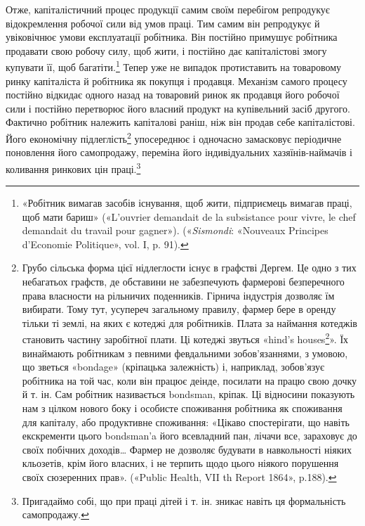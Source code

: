 Отже, капіталістичний процес продукції самим своїм перебігом
репродукує відокремлення робочої сили від умов праці.
Тим самим він репродукує й увіковічнює умови експлуатації
робітника. Він постійно примушує робітника продавати свою
робочу силу, щоб жити, і постійно дає капіталістові змогу купувати
її, щоб багатіти.\footnote{
«Робітник вимагав засобів існування, щоб жити, підприємець
вимагав праці, щоб мати бариш» («L’ouvrier demandait de la subsistance
pour vivre, le chef demandait du travail pour gagner»). («\emph{Sismondi}: «Nouveaux
Principes d’Economie Politique», vol. I, p. 91).
} Тепер уже не випадок протиставить на
товаровому ринку капіталіста й робітника як покупця і продавця.
Механізм самого процесу постійно відкидає одного назад на
товаровий ринок як продавця його робочої сили і постійно перетворює
його власний продукт на купівельний засіб другого.
Фактично робітник належить капіталові раніш, ніж він продав
себе капіталістові. Його економічну підлеглість\footnote{
Грубо сільська форма цієї нідлеглости існує в графстві Дергем.
Це одно з тих небагатьох графств, де обставини не забезпечують фармерові
безперечного права власности на рільничих поденників. Гірнича
індустрія дозволяє їм вибирати. Тому тут, усупереч загальному правилу,
фармер бере в оренду тільки ті землі, на яких є котеджі для робітників.
Плата за наймання котеджів становить частину заробітної плати. Ці котеджі
звуться «hind’s houses\footnote*{
— доми слуг. \emph{Ред.}
}». Їх винаймають робітникам з певними февдальними
зобов’язаннями, з умовою, що зветься «bondage» (кріпацька
залежність) і, наприклад, зобов’язує робітника на той час, коли він працює
деінде, посилати на працю свою дочку й т. ін. Сам робітник називається
bondsman, кріпак. Ці відносини показують нам з цілком нового
боку і особисте споживання робітника як споживання для капіталу, або
продуктивне споживання: «Цікаво спостерігати, що навіть екскременти
цього bondsman’a його всевладний пан, лічачи все, зараховує до своїх побічних
доходів\dots{} Фармер не дозволяє будувати в навкольності ніяких кльозетів,
крім його власних, і не терпить щодо цього ніякого порушення своїх сюзеренних
прав». («Public Health, VII th Report 1864», p.188).
} упосереднює
і одночасно замасковує періодичне поновлення його самопродажу,
переміна його індивідуальних хазяїнів-наймачів і коливання
ринкових цін праці.\footnote{
Пригадаймо собі, що при праці дітей і т. ін. зникає навіть ця формальність
самопродажу.
}

